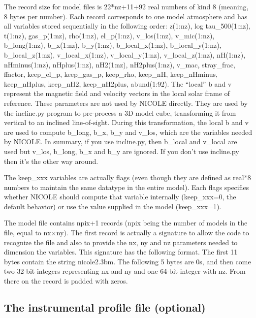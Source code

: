 The record size for model files is 22*nz+11+92 real numbers of kind 8
(meaning, 8 bytes per number). Each record corresponds to one model
atmosphere and has all variables stored sequentially in the following
order: z(1:nz), log tau\_500(1:nz), t(1:nz), gas\_p(1:nz), rho(1:nz),
el\_p(1:nz), v\_los(1:nz), v\_mic(1:nz), b\_long(1:nz), b\_x(1:nz),
b\_y(1:nz), b\_local\_x(1:nz), b\_local\_y(1:nz), b\_local\_z(1:nz),
v\_local\_x(1:nz), v\_local\_y(1:nz), v\_local\_z(1:nz), nH(1:nz),
nHminus(1:nz), nHplus(1:nz), nH2(1:nz), nH2plus(1:nz), v\_mac,
stray\_frac, ffactor, keep\_el\_p, keep\_gas\_p, keep\_rho, 
keep\_nH, keep\_nHminus, keep\_nHplus, keep\_nH2, keep\_nH2plus,
abund(1:92). The ``local'' b and v represent
the magnetic field and velocity vectors in the local solar frame of
reference.  These parameters are not used by NICOLE directly. They are
used by the incline.py program to pre-process a 3D model cube,
transforming it from vertical to an inclined line-of-sight. During
this transformation, the local b and v are used to compute b\_long,
b\_x, b\_y and v\_los, which are the variables needed by NICOLE. In
summary, if you use incline.py, then b\_local and v\_local are used
but v\_los, b\_long, b\_x and b\_y are ignored. If you don't use
incline.py then it's the other way around.

 The keep\_xxx variables are actually flags (even though they are
 defined as real*8 numbers to maintain the same datatype in the entire
 model). Each flags specifies whether NICOLE should compute that
 variable internally (keep\_xxx=0, the default behavior) or use the
 value supplied in the model (keep\_xxx=1).

The model file contains npix+1 records (npix being the number of models in
the file, equal to nx$\times$ny). The first record is actually a
signature to allow the code to recognize the file and also to provide
the nx, ny and nz parameters needed to dimension the variables. This
signature has the following format. The first 11 bytes contain the
string nicole2.3bm. The following 5 bytes are 0s, and then come two
32-bit integers representing nx and ny and one 64-bit integer with
nz. From there on the record is padded with zeros.

\subsection{The instrumental profile file (optional)}
\label{instprof}

